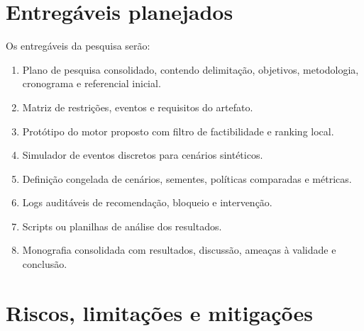 \documentclass[
  12pt,
  oneside,
  a4paper,
  sumario=tradicional,
  brazil
]{abntex2}
\begin{document}
\chapter{Entreg\'aveis planejados}

Os entreg\'aveis da pesquisa ser\~ao:

\begin{enumerate}[leftmargin=1.27cm,itemsep=0pt,topsep=0pt,parsep=0pt,partopsep=0pt]
  \item Plano de pesquisa consolidado, contendo delimita\c{c}\~ao, objetivos, metodologia, cronograma e referencial inicial.
  \item Matriz de restri\c{c}\~oes, eventos e requisitos do artefato.
  \item Prot\'otipo do motor proposto com filtro de factibilidade e ranking local.
  \item Simulador de eventos discretos para cen\'arios sint\'eticos.
  \item Defini\c{c}\~ao congelada de cen\'arios, sementes, pol\'iticas comparadas e m\'etricas.
  \item Logs audit\'aveis de recomenda\c{c}\~ao, bloqueio e interven\c{c}\~ao.
  \item Scripts ou planilhas de an\'alise dos resultados.
  \item Monografia consolidada com resultados, discuss\~ao, amea\c{c}as \`a validade e conclus\~ao.
\end{enumerate}

\chapter{Riscos, limita\c{c}\~oes e mitiga\c{c}\~oes}
\end{document}
